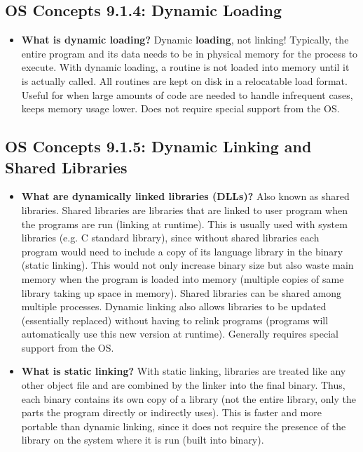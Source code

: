 \documentclass[12pt]{article}
\begin{document}
\subsection*{OS Concepts 9.1.4: Dynamic Loading}

\begin{itemize}
    \item \textbf{What is dynamic loading?} Dynamic \textbf{loading}, not linking! Typically, the entire program and its data needs to be in physical memory for the process to execute. With dynamic loading, a routine is not loaded into memory until it is actually called. All routines are kept on disk in a relocatable load format. Useful for when large amounts of code are needed to handle infrequent cases, keeps memory usage lower. Does not require special support from the OS.
\end{itemize}

\subsection*{OS Concepts 9.1.5: Dynamic Linking and Shared Libraries}

\begin{itemize}
    \item \textbf{What are dynamically linked libraries (DLLs)?} Also known as shared libraries. Shared libraries are libraries that are linked to user program when the programs are run (linking at runtime). This is usually used with system libraries (e.g. C standard library), since without shared libraries each program would need to include a copy of its language library in the binary (static linking). This would not only increase binary size but also waste main memory when the program is loaded into memory (multiple copies of same library taking up space in memory). Shared libraries can be shared among multiple processes. Dynamic linking also allows libraries to be updated (essentially replaced) without having to relink programs (programs will automatically use this new version at runtime). Generally requires special support from the OS.
    \item \textbf{What is static linking?} With static linking, libraries are treated like any other object file and are combined by the linker into the final binary. Thus, each binary contains its own copy of a library (not the entire library, only the parts the program directly or indirectly uses). This is faster and more portable than dynamic linking, since it does not require the presence of the library on the system where it is run (built into binary).
\end{itemize}
\end{document}
